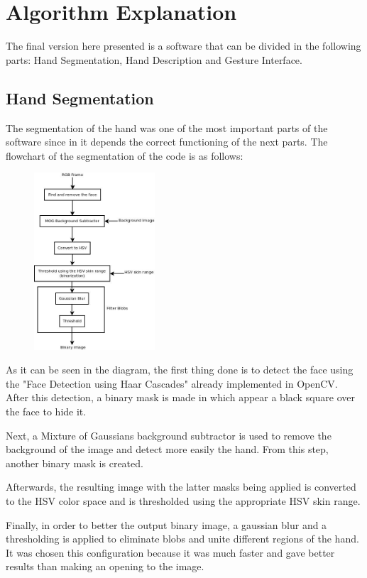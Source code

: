 \section{Algorithm Explanation}

The final version here presented is a software that can be divided in the following parts: Hand Segmentation, Hand Description and Gesture Interface.

\subsection{Hand Segmentation}
The segmentation of the hand was one of the most important parts of the software since in it depends the correct functioning of the next parts. 
The flowchart of the segmentation of the code is as follows: 

\begin{figure}[H]
	\centering
	 \includegraphics[width=0.4\textwidth]{../hand_filter.jpeg} 
\end{figure}

As it can be seen in the diagram, the first thing done is to detect the face using the "Face Detection using Haar Cascades" already implemented in OpenCV. After this detection, a binary mask is made in which appear a black square over the face to hide it.

Next, a Mixture of Gaussians background subtractor is used to remove the background of the image and detect more easily the hand. From this step, another binary mask is created. 

Afterwards, the resulting image with the latter masks being applied is converted to the HSV color space and is thresholded using the appropriate HSV skin range.

Finally, in order to better the output binary image, a gaussian blur and a thresholding is applied to eliminate blobs and unite different regions of the hand. It was chosen this configuration because it was much faster and gave better results than making an opening to the image. 

